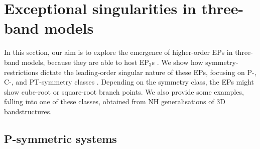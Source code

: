 \documentclass[aps, prb, onecolumn, nofootinbib, citeautoscript, 10pt]{revtex4-2}
\begin{document}
\section{Exceptional singularities in three-band models}
\label{secep3}

In this section, our aim is to explore the emergence of higher-order EPs in three-band models, because they are able to host EP$_3$s \cite{ips-emil}. We show how symmetry-restrictions dictate the leading-order singular nature of these EPs, focusing on P-, C-, and PT-symmetry classes \cite{bernard}. Depending on the symmetry class, the EPs might show cube-root or square-root branch points. We also provide some examples, falling into one of these classes, obtained from NH generalisations of 3D bandstructures.



\subsection{P-symmetric systems}
\end{document}
